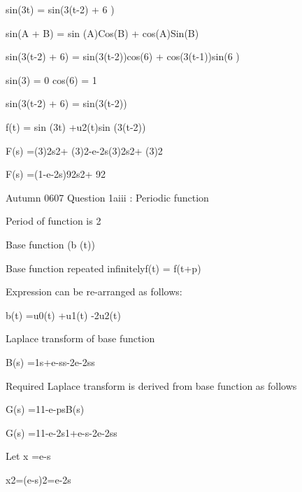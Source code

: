 


sin(3\pi t) = sin(3\pi (t-2) + 6 \pi )


sin(A + B) = sin (A)Cos(B) + cos(A)Sin(B) 


sin(3\pi (t-2) + 6\pi ) = sin(3\pi (t-2))cos(6\pi ) + cos(3\pi(t-1))sin(6 \pi )


sin(3\pi) = 0              cos(6\pi) = 1


sin(3(t-2) + 6) = sin(3(t-2))


f(t) = sin (3t) +u2(t)sin (3(t-2))


F(s) =(3)2s2+ (3)2-e-2s(3)2s2+ (3)2


F(s) =(1-e-2s)92s2+ 92

 

 

Autumn 0607 Question 1aiii : Periodic function

 

Period of function is 2

 

Base function (b (t))

 

Base function repeated infinitelyf(t) = f(t+p)


Expression can be re-arranged as follows:

 

b(t) =u0(t) +u1(t) -2u2(t) 

 

Laplace transform of base function

 

B(s) =1s+e-ss-2e-2ss 

 

 

Required Laplace transform is derived from base function as follows

 

 

G(s) =11-e-psB(s) 

 

G(s) =11-e-2s1+e-s-2e-2ss 

 

 

 

Let     x =e-s

 

        x2=(e-s)2=e-2s

